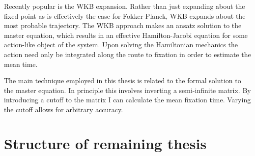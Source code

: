 Recently popular is the WKB expansion. 
Rather than just expanding about the fixed point as is effectively the case for Fokker-Planck, WKB expands about the most probable trajectory. 
The WKB approach makes an ansatz solution to the master equation, which results in an effective Hamilton-Jacobi equation for some action-like object of the system. 
Upon solving the Hamiltonian mechanics the action need only be integrated along the route to fixation in order to estimate the mean time. 

The main technique employed in this thesis is related to the formal solution to the master equation. 
In principle this involves inverting a semi-infinite matrix. 
By introducing a cutoff to the matrix I can calculate the mean fixation time. 
Varying the cutoff allows for arbitrary accuracy. 



\section{Structure of remaining thesis}

